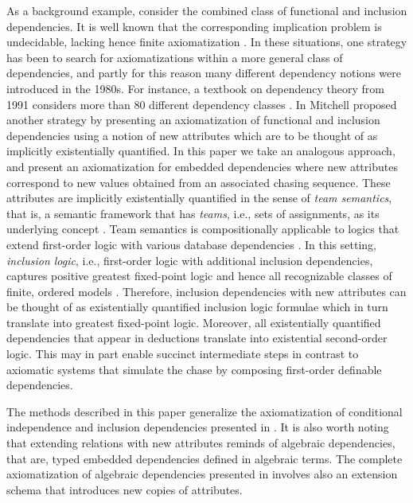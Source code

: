 \documentclass[envcountset]{llncs}
\begin{document}
As a background example, consider the combined class of functional and inclusion dependencies. It is well known that the corresponding implication problem is undecidable, lacking hence finite axiomatization \cite{chandra85,mitchell83}.  In these situations, one strategy has been to search for axiomatizations within a more general class of   dependencies, and partly for this reason many different dependency notions were introduced in the 1980s. For instance, a textbook on dependency theory from 1991 considers more than  80 different dependency classes \cite{thalheim91}. In \cite{mitchell83b} Mitchell proposed  another strategy by presenting an axiomatization of functional and inclusion dependencies using a notion of new attributes which are to be thought of as implicitly existentially quantified. In this paper we take an analogous approach, and present an axiomatization for embedded dependencies where new attributes correspond to new  values obtained from an associated chasing sequence. These attributes are implicitly existentially quantified in the sense of \emph{team semantics}, that is, a semantic framework that has \emph{teams}, i.e.,  sets of assignments, as its underlying concept \cite{hodges97}. Team semantics is compositionally applicable to logics that extend first-order logic with various database dependencies \cite{galliani12,vaananen07}.  In this setting, \emph{inclusion logic}, i.e., first-order logic with additional inclusion dependencies, captures positive greatest fixed-point logic and hence all  recognizable classes of finite, ordered models \cite{gallhella13,immerman86,vardi82}. Therefore, inclusion dependencies with new attributes can be  thought of as existentially quantified inclusion logic formulae which in turn translate into greatest fixed-point logic. Moreover, all existentially quantified dependencies that appear in deductions translate into existential second-order logic. This may in part enable succinct intermediate  steps in contrast to axiomatic systems that simulate the chase by composing first-order definable dependencies. 

The methods described in this paper generalize the axiomatization of conditional independence and inclusion dependencies presented in \cite{hannula14}. It is also worth noting that extending relations with new attributes reminds of algebraic dependencies, that are, typed embedded dependencies defined in algebraic terms. The complete axiomatization of algebraic dependencies presented in \cite{yannakakis82} involves also an extension schema that introduces new copies of attributes.
\end{document}
